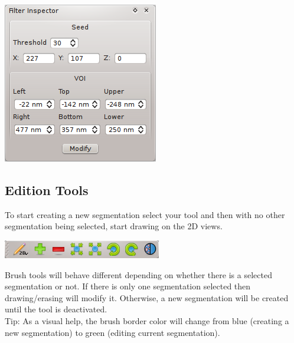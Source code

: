 \begin{center}
\includegraphics{fig/SeedGrowSegmentationFilterInspector}
\end{center}
\vspace{0.3cm}

\subsection{Edition Tools}
To start creating a new segmentation select your tool and then with no other
segmentation being selected, start drawing on the 2D views.

\begin{center}
\includegraphics{fig/EditorToolbar}
\end{center}
\vspace{0.3cm}

Brush tools will behave different depending on whether there is a selected
segmentation or not. If there is only one segmentation selected then
drawing/erasing will modify it. Otherwise, a new segmentation will be created
until the tool is deactivated. \\

Tip: As a visual help, the brush border color will change from blue (creating a
new segmentation) to green (editing current segmentation).

